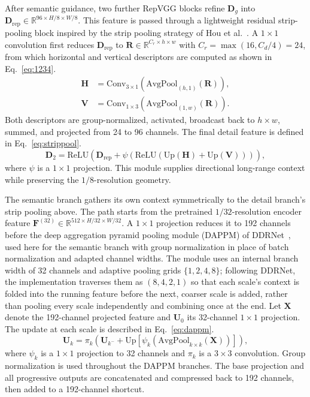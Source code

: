 \documentclass[a4paper,fleqn, review]{cas-sc}
\begin{document}
After semantic guidance, two further RepVGG blocks refine $\mathbf{D}_{g}$
into $\mathbf{D}_{\mathrm{rep}}\in\mathbb{R}^{96\times H/8\times W/8}$. This
feature is passed through a lightweight residual strip-pooling block
inspired by the strip pooling strategy of Hou et al.~\cite{hou2020strip}. A
$1\times1$ convolution first reduces $\mathbf{D}_{\mathrm{rep}}$ to
$\mathbf{R}\in\mathbb{R}^{C_r\times h\times w}$ with
$C_r=\max(16,C_d/4)=24$, from which horizontal and vertical descriptors are
computed as shown in Eq.~\eqref{eq:1234}.
%
\begin{equation}
	\label{eq:1234}
	\begin{aligned}
		\mathbf{H} &=
		\mathrm{Conv}_{3\times1}
		\left(
		\mathrm{AvgPool}_{(h,1)}(\mathbf{R})
		\right),\\
		\mathbf{V} &=
		\mathrm{Conv}_{1\times3}
		\left(
		\mathrm{AvgPool}_{(1,w)}(\mathbf{R})
		\right).
	\end{aligned}
\end{equation}
%
Both descriptors are group-normalized, activated, broadcast back to
$h\times w$, summed, and projected from 24 to 96 channels. The final detail
feature is defined in Eq.~\eqref{eq:strippool}. 
%
\begin{equation}
\label{eq:strippool}
\mathbf{D}_2 =
\mathrm{ReLU}\!\left(
\mathbf{D}_{\mathrm{rep}}+
\psi\!\left(
\mathrm{ReLU}(\mathrm{Up}(\mathbf{H})+\mathrm{Up}(\mathbf{V}))
\right)
\right),
\end{equation}
%
where $\psi$ is a $1\times1$ projection. This module supplies directional
long-range context while preserving the $1/8$-resolution geometry.

\label{subsec:dappm}
The semantic branch gathers its own context symmetrically to the detail
branch's strip pooling above. The path starts from the pretrained
$1/32$-resolution encoder feature
$\mathbf{F}^{(32)}\in\mathbb{R}^{512\times H/32\times W/32}$. A $1\times1$
projection reduces it to 192 channels before the deep aggregation pyramid
pooling module (DAPPM) of DDRNet~\cite{pan2023ddrnet}, used here for the
semantic branch with group normalization in place of batch normalization and
adapted channel widths. The module uses an internal branch width of 32
channels and adaptive pooling grids $\{1,2,4,8\}$; following DDRNet, the
implementation traverses them as $(8,4,2,1)$ so that each scale's context is
folded into the running feature before the next, coarser scale is added,
rather than pooling every scale independently and combining once at the end.
Let $\mathbf{X}$ denote the 192-channel projected feature and $\mathbf{U}_0$
its 32-channel $1\times1$ projection. The update at each scale is described in Eq.~\eqref{eq:dappm}.
%
\begin{equation}
\label{eq:dappm}
\mathbf{U}_{k}=
\pi_k\!\left(
\mathbf{U}_{k^{-}}+
\mathrm{Up}\!\left[
\psi_k\!\left(
\mathrm{AvgPool}_{k\times k}(\mathbf{X})
\right)\right]
\right),
\end{equation}
%
where $\psi_k$ is a $1\times1$ projection to 32 channels and $\pi_k$ is a
$3\times3$ convolution. Group normalization is used throughout the DAPPM
branches. The base projection and all progressive outputs are concatenated and
compressed back to 192 channels, then added to a 192-channel shortcut.
\end{document}
